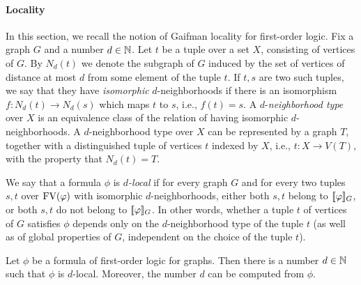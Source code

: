 \paragraph{Locality}
In this section, we recall the notion of Gaifman locality for first-order logic. 
Fix a graph $G$ and a number $d\in\mathbb{N}$. Let $t$ be a tuple over a set $X$, consisting of vertices of $G$.
By $N_d(t)$ we denote the subgraph of $G$ induced by the set of vertices of distance at most $d$ from some element of the tuple $t$.
If $t,s$ are two such tuples, we say that they have \emph{isomorphic} 
$d$-neighborhoods if there is an isomorphism  $f:N_d(t)\to N_d(s)$
which maps $t$ to $s$, i.e., $f(t)=s$. 
A $d$-\emph{neighborhood type} over $X$ is an equivalence class
of the relation of having isomorphic $d$-neighborhoods. 
A $d$-neighborhood type over $X$ can be represented by a graph $T$, together
with a distinguished tuple of vertices $t$ indexed by $X$, i.e.,
$t:X\to V(T)$, with the property that $N_d(t)=T$.

We say that a formula $\phi$ is \emph{$d$-local} if for every graph $G$
and for every two tuples $s,t$ over $\textrm{FV}(\varphi)$ with isomorphic $d$-neighborhoods, 
either both $s,t$ belong to $[\![\varphi]\!]_G$, or both $s,t$ do not belong to $[\![\varphi]\!]_G$. In other words, whether a tuple $t$ of vertices of $G$ satisfies $\phi$ depends only on the $d$-neighborhood type of  the tuple $t$ (as well as of global properties of $G$, independent on the choice of the tuple $t$).

\begin{theorem}\label{thm:gaifman}
	Let $\phi$ be a formula of first-order logic for graphs.
	Then there is a number $d\in\mathbb{N}$ such that $\phi$ is $d$-local.	
	Moreover, the number $d$ can be computed from $\phi$.
\end{theorem}

